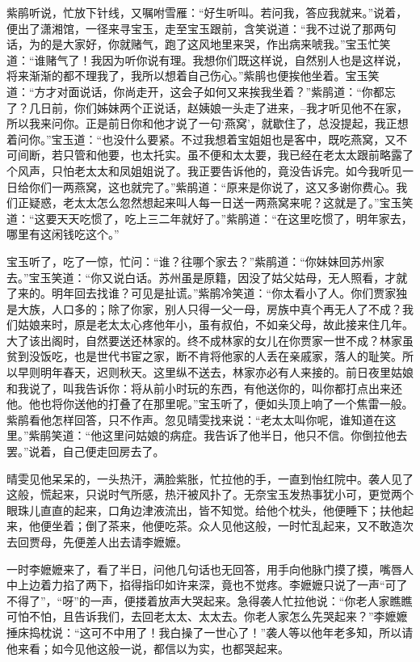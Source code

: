 \documentclass[12pt,oneside]{book}
\begin{document}
紫鹃听说，忙放下针线，又嘱咐雪雁：“好生听叫。若问我，答应我就来。”说着，便出了潇湘馆，一径来寻宝玉，走至宝玉跟前，含笑说道：“我不过说了那两句话，为的是大家好，你就赌气，跑了这风地里来哭，作出病来唬我。”宝玉忙笑道：“谁赌气了！我因为听你说有理。我想你们既这样说，自然别人也是这样说，将来渐渐的都不理我了，我所以想着自己伤心。”紫鹃也便挨他坐着。宝玉笑道：“方才对面说话，你尚走开，这会子如何又来挨我坐着？”紫鹃道：“你都忘了？几日前，你们姊妹两个正说话，赵姨娘一头走了进来，--我才听见他不在家，所以我来问你。正是前日你和他才说了一句‘燕窝’，就歇住了，总没提起，我正想着问你。”宝玉道：“也没什么要紧。不过我想着宝姐姐也是客中，既吃燕窝，又不可间断，若只管和他要，也太托实。虽不便和太太要，我已经在老太太跟前略露了个风声，只怕老太太和凤姐姐说了。我正要告诉他的，竟没告诉完。如今我听见一日给你们一两燕窝，这也就完了。”紫鹃道：“原来是你说了，这又多谢你费心。我们正疑惑，老太太怎么忽然想起来叫人每一日送一两燕窝来呢？这就是了。”宝玉笑道：“这要天天吃惯了，吃上三二年就好了。”紫鹃道：“在这里吃惯了，明年家去，哪里有这闲钱吃这个。”

宝玉听了，吃了一惊，忙问：“谁？往哪个家去？”紫鹃道：“你妹妹回苏州家去。”宝玉笑道：“你又说白话。苏州虽是原籍，因没了姑父姑母，无人照看，才就了来的。明年回去找谁？可见是扯谎。”紫鹃冷笑道：“你太看小了人。你们贾家独是大族，人口多的；除了你家，别人只得一父一母，房族中真个再无人了不成？我们姑娘来时，原是老太太心疼他年小，虽有叔伯，不如亲父母，故此接来住几年。大了该出阁时，自然要送还林家的。终不成林家的女儿在你贾家一世不成？林家虽贫到没饭吃，也是世代书宦之家，断不肯将他家的人丢在亲戚家，落人的耻笑。所以早则明年春天，迟则秋天。这里纵不送去，林家亦必有人来接的。前日夜里姑娘和我说了，叫我告诉你：将从前小时玩的东西，有他送你的，叫你都打点出来还他。他也将你送他的打叠了在那里呢。”宝玉听了，便如头顶上响了一个焦雷一般。紫鹃看他怎样回答，只不作声。忽见晴雯找来说：“老太太叫你呢，谁知道在这里。”紫鹃笑道：“他这里问姑娘的病症。我告诉了他半日，他只不信。你倒拉他去罢。”说着，自己便走回房去了。

晴雯见他呆呆的，一头热汗，满脸紫胀，忙拉他的手，一直到怡红院中。袭人见了这般，慌起来，只说时气所感，热汗被风扑了。无奈宝玉发热事犹小可，更觉两个眼珠儿直直的起来，口角边津液流出，皆不知觉。给他个枕头，他便睡下；扶他起来，他便坐着；倒了茶来，他便吃茶。众人见他这般，一时忙乱起来，又不敢造次去回贾母，先便差人出去请李嬷嬷。

一时李嬷嬷来了，看了半日，问他几句话也无回答，用手向他脉门摸了摸，嘴唇人中上边着力掐了两下，掐得指印如许来深，竟也不觉疼。李嬷嬷只说了一声“可了不得了”，“呀”的一声，便搂着放声大哭起来。急得袭人忙拉他说：“你老人家瞧瞧可怕不怕，且告诉我们，去回老太太、太太去。你老人家怎么先哭起来？”李嬷嬷捶床捣枕说：“这可不中用了！我白操了一世心了！”袭人等以他年老多知，所以请他来看；如今见他这般一说，都信以为实，也都哭起来。
\end{document}
